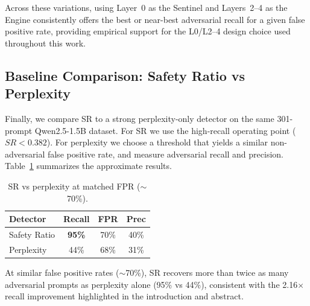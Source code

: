 Across these variations, using Layer~0 as the Sentinel and Layers~2--4 as the Engine consistently offers the best or near-best
adversarial recall for a given false positive rate, providing empirical support for the L0/L2--4 design choice used throughout
this work.

\subsection{Baseline Comparison: Safety Ratio vs Perplexity}

Finally, we compare SR to a strong perplexity-only detector on the same 301-prompt Qwen2.5-1.5B dataset. For SR we use the
high-recall operating point ($SR < 0.382$). For perplexity we choose a threshold that yields a similar non-adversarial false
positive rate, and measure adversarial recall and precision. Table~\ref{tab:baseline_comparison} summarizes the approximate
results.

\begin{table}[h]
\centering
\caption{SR vs perplexity at matched FPR ($\sim$70\%).}
\label{tab:baseline_comparison}
\begin{tabular*}{\columnwidth}{@{\extracolsep{\fill}}lccc@{}}
\hline
\textbf{Detector} & \textbf{Recall} & \textbf{FPR} & \textbf{Prec} \\
\hline
Safety Ratio & \textbf{95\%} & 70\% & 40\% \\
Perplexity & 44\% & 68\% & 31\% \\
\hline
\end{tabular*}
\end{table}

At similar false positive rates ($\sim$70\%), SR recovers more than twice as many adversarial prompts as perplexity alone
(95\% vs 44\%), consistent with the 2.16$\times$ recall improvement highlighted in the introduction and abstract.

